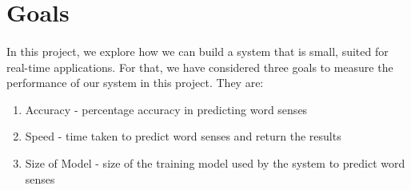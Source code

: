 

\section{Goals}
\paragraph{}
In this project, we explore how we can build a system that is small, suited for real-time applications. For that, we have considered three goals to measure the performance of our system in this project. They are:
\begin{enumerate}
\item Accuracy - percentage accuracy in predicting word senses
\item Speed - time taken to predict word senses and return the results
\item Size of Model - size of the training model used by the system to predict word senses
\end{enumerate}
